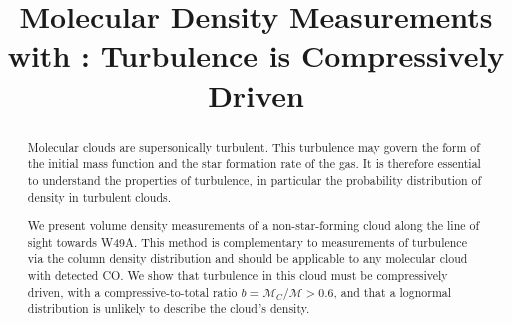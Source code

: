\title{Molecular Density Measurements with \formaldehyde: Turbulence is
    Compressively Driven}
\begin{abstract}
    Molecular clouds are supersonically turbulent.  This turbulence may govern
    the form of the initial mass function and the star formation rate of the
    gas.  It is therefore essential to understand the properties of turbulence,
    in particular the probability distribution of density in turbulent clouds.

    We present \formaldehyde volume density measurements of a non-star-forming
    cloud along the line of sight towards W49A.  This method is complementary
    to measurements of turbulence via the column density distribution and
    should be applicable to any molecular cloud with detected CO.  We show that
    turbulence in this cloud must be compressively driven, with a
    compressive-to-total ratio $b = \mathcal{M}_C/\mathcal{M}>0.6$, and that a
    lognormal distribution is unlikely to describe the cloud's density.  
\end{abstract}
